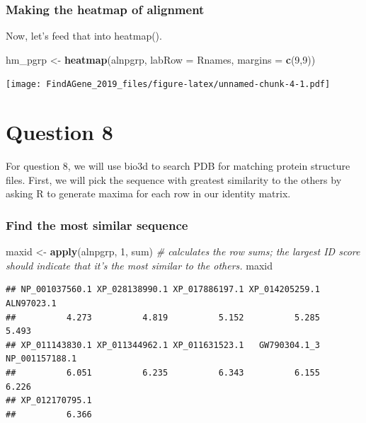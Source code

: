 \documentclass[]{article}
\newenvironment{Shaded}{\begin{snugshade}}{\end{snugshade}}
\newcommand{\KeywordTok}[1]{\textcolor[rgb]{0.13,0.29,0.53}{\textbf{#1}}}
\newcommand{\DataTypeTok}[1]{\textcolor[rgb]{0.13,0.29,0.53}{#1}}
\newcommand{\DecValTok}[1]{\textcolor[rgb]{0.00,0.00,0.81}{#1}}
\newcommand{\StringTok}[1]{\textcolor[rgb]{0.31,0.60,0.02}{#1}}
\newcommand{\CommentTok}[1]{\textcolor[rgb]{0.56,0.35,0.01}{\textit{#1}}}
\newcommand{\NormalTok}[1]{#1}
\begin{document}
\subsubsection{Making the heatmap of
alignment}\label{making-the-heatmap-of-alignment}

Now, let's feed that into heatmap().

\begin{Shaded}
\begin{Highlighting}[]
\NormalTok{hm_pgrp <-}\StringTok{ }\KeywordTok{heatmap}\NormalTok{(alnpgrp, }\DataTypeTok{labRow =}\NormalTok{ Rnames, }\DataTypeTok{margins =} \KeywordTok{c}\NormalTok{(}\DecValTok{9}\NormalTok{,}\DecValTok{9}\NormalTok{))}
\end{Highlighting}
\end{Shaded}

\texttt{[image: FindAGene\_2019\_files/figure-latex/unnamed-chunk-4-1.pdf]}

\section{Question 8}\label{question-8}

For question 8, we will use bio3d to search PDB for matching protein
structure files. First, we will pick the sequence with greatest
similarity to the others by asking R to generate maxima for each row in
our identity matrix.

\subsubsection{Find the most similar
sequence}\label{find-the-most-similar-sequence}

\begin{Shaded}
\begin{Highlighting}[]
\NormalTok{maxid <-}\StringTok{ }\KeywordTok{apply}\NormalTok{(alnpgrp, }\DecValTok{1}\NormalTok{, sum) }\CommentTok{# calculates the row sums; the largest ID score should indicate that it's the most similar to the others. }
\NormalTok{maxid}
\end{Highlighting}
\end{Shaded}

\begin{verbatim}
## NP_001037560.1 XP_028138990.1 XP_017886197.1 XP_014205259.1     ALN97023.1 
##          4.273          4.819          5.152          5.285          5.493 
## XP_011143830.1 XP_011344962.1 XP_011631523.1   GW790304.1_3 NP_001157188.1 
##          6.051          6.235          6.343          6.155          6.226 
## XP_012170795.1 
##          6.366
\end{verbatim}
\end{document}
